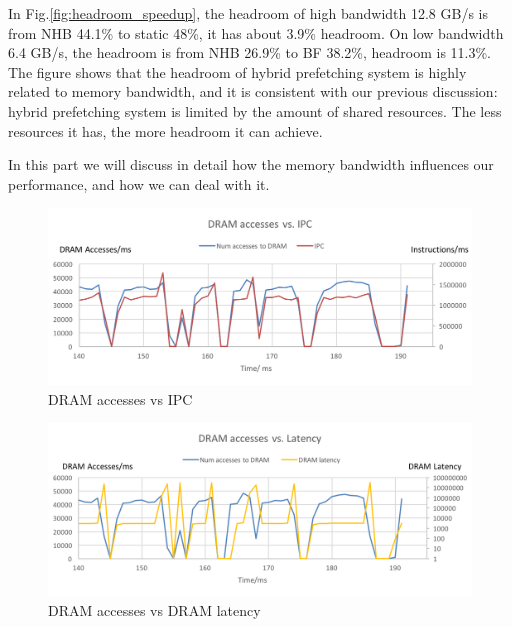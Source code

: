   \label{sec:memorybandwidhissue}
  In Fig.\ref{fig:headroom_speedup}, the headroom of high bandwidth 12.8 GB/s is from NHB 44.1\% to static 48\%, it has about 3.9\% headroom. On low bandwidth 6.4 GB/s, the headroom is from NHB 26.9\% to BF 38.2\%, headroom is 11.3\%. 
  The figure shows that the headroom of hybrid prefetching system is highly related to memory bandwidth, and it is consistent with our previous discussion: hybrid prefetching system is limited by the amount of shared resources. 
  The less resources it has, the more headroom it can achieve.\par
  In this part we will discuss in detail how the memory bandwidth influences our performance, and how we can deal with it.\par

    \begin{figure}[ht!]
	   \centering
	   \includegraphics[width=1.0\textwidth]{images/bandwidth_IPC.png}
	   \caption{DRAM accesses vs IPC}
	  \label{fig:bandwidth_IPC}
  \end{figure}
  \begin{figure}[ht!]
	   \centering
	   \includegraphics[width=1.0\textwidth]{images/bandwidth_latency.png}
	   \caption{DRAM accesses vs DRAM latency}
	  \label{fig:bandwidth_latency}
  \end{figure}

